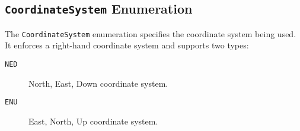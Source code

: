 \subsection{\texttt{CoordinateSystem} Enumeration}
The \texttt{CoordinateSystem} enumeration specifies the coordinate system being used. It enforces a right-hand coordinate system and supports two types:

\begin{description}
    \item[\texttt{NED}] North, East, Down coordinate system.
    \item[\texttt{ENU}] East, North, Up coordinate system.
\end{description}